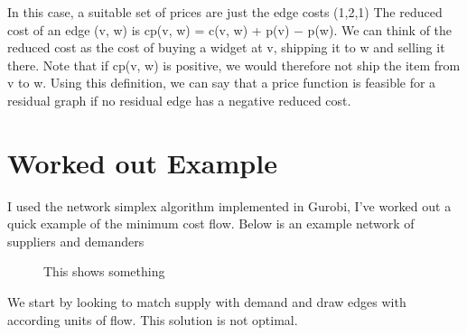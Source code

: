 \documentclass{report}
\begin{document}
In this case, a suitable set of prices are just the edge costs (1,2,1)
The reduced cost of an edge (v, w) is cp(v, w) = c(v, w) + p(v) − p(w).
We can think of the reduced cost as the cost of buying a widget at v, shipping it to w and selling it
there. Note that if cp(v, w) is positive, we would therefore not ship the item from v to w.
Using this definition, we can say that a price function is feasible for a residual graph if no residual
edge has a negative reduced cost.


\section{Worked out Example}

I used the network simplex algorithm implemented in Gurobi, I've worked out a quick example of the minimum cost flow.
Below is an example network of suppliers and demanders

\begin{figure}
\centering
\begin{framed}
\caption{This shows something}
\end{framed}
\end{figure}

We start by looking to match supply with demand and draw edges with according units of flow. This solution is not optimal.
\end{document}
